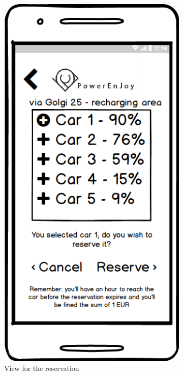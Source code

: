 	\begin{figure}[h]
 
		\begin{subfigure}{0.3\paperwidth}
			\centering
			\includegraphics[scale=0.35]{img/mockups/User_reservation.png}
			\caption{View for the reservation}
			\label{fig:subim1}
		\end{subfigure}
		\begin{subfigure}{0.3\paperwidth}
			\centering

\end{subfigure}
\end{figure}
